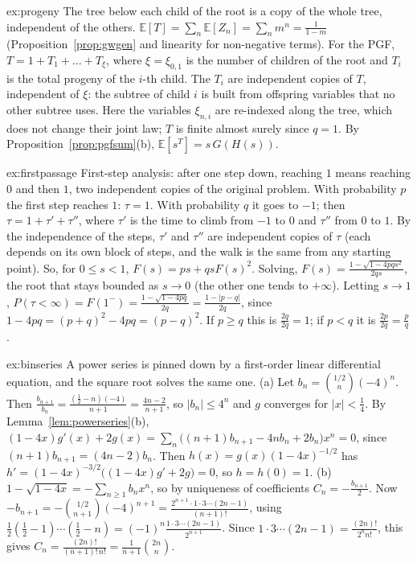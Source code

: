 \begin{solution}{ex:progeny}
\idea The tree below each child of the root is a copy of the whole tree, independent of the others.
\writeup $\mathbb E[T]=\sum_n\mathbb E[Z_n]=\sum_nm^n=\frac1{1-m}$ (Proposition~\ref{prop:gwgen} and linearity for non-negative terms). For the PGF,
$T=1+T_1+\dots+T_{\xi}$, where $\xi=\xi_{0,1}$ is the number of children of the root and $T_i$ is the total progeny of the $i$-th
child. The $T_i$ are independent copies of $T$, independent of $\xi$: the subtree of child $i$ is built from offspring
variables that no other subtree uses. Here the variables $\xi_{n,i}$ are re-indexed along the tree, which does not change
their joint law; $T$ is finite almost surely since $q=1$. By Proposition~\ref{prop:pgfsum}(b), $\mathbb E[s^{T}]=s\,G(H(s))$.
\end{solution}

\begin{solution}{ex:firstpassage}
\idea First-step analysis: after one step down, reaching $1$ means reaching $0$ and then $1$, two independent copies of
the original problem.
\writeup With probability $p$ the first step reaches $1$: $\tau=1$. With probability $q$ it goes to $-1$; then $\tau=1+\tau'+\tau''$, where $\tau'$
is the time to climb from $-1$ to $0$ and $\tau''$ from $0$ to $1$. By the independence of the steps, $\tau'$ and $\tau''$ are independent
copies of $\tau$ (each depends on its own block of steps, and the walk is the same from any starting point). So, for
$0\le s<1$, $F(s)=ps+qsF(s)^2$. Solving, $F(s)=\frac{1-\sqrt{1-4pqs^2}}{2qs}$, the root that stays bounded as $s\to0$ (the other one
tends to $+\infty$). Letting $s\to1$, $P(\tau<\infty)=F(1^-)=\frac{1-\sqrt{1-4pq}}{2q}=\frac{1-|p-q|}{2q}$, since
$1-4pq=(p+q)^2-4pq=(p-q)^2$. If $p\ge q$ this is $\frac{2q}{2q}=1$; if $p<q$ it is $\frac{2p}{2q}=\frac pq$.
\end{solution}

\begin{solution}{ex:binseries}
\idea A power series is pinned down by a first-order linear differential equation, and the square root solves the
same one.
\writeup (a) Let $b_n=\binom{1/2}n(-4)^n$. Then $\frac{b_{n+1}}{b_n}=\frac{(\frac12-n)(-4)}{n+1}=\frac{4n-2}{n+1}$, so $|b_n|\le4^n$ and $g$ converges for $|x|<\frac14$.
By Lemma~\ref{lem:powerseries}(b), $(1-4x)g'(x)+2g(x)=\sum_n\bigl((n+1)b_{n+1}-4nb_n+2b_n\bigr)x^n=0$, since $(n+1)b_{n+1}=(4n-2)b_n$. Then
$h(x)=g(x)(1-4x)^{-1/2}$ has $h'=(1-4x)^{-3/2}\bigl((1-4x)g'+2g\bigr)=0$, so $h=h(0)=1$.
(b) $1-\sqrt{1-4x}=-\sum_{n\ge1}b_nx^n$, so by uniqueness of coefficients $C_n=-\frac{b_{n+1}}2$. Now
$-b_{n+1}=-\binom{1/2}{n+1}(-4)^{n+1}=\frac{2^{n+1}\cdot1\cdot3\cdots(2n-1)}{(n+1)!}$, using $\frac12(\frac12-1)\cdots(\frac12-n)=(-1)^n\frac{1\cdot3\cdots(2n-1)}{2^{n+1}}$. Since
$1\cdot3\cdots(2n-1)=\frac{(2n)!}{2^nn!}$, this gives $C_n=\frac{(2n)!}{(n+1)!\,n!}=\frac1{n+1}\binom{2n}n$.
\end{solution}

